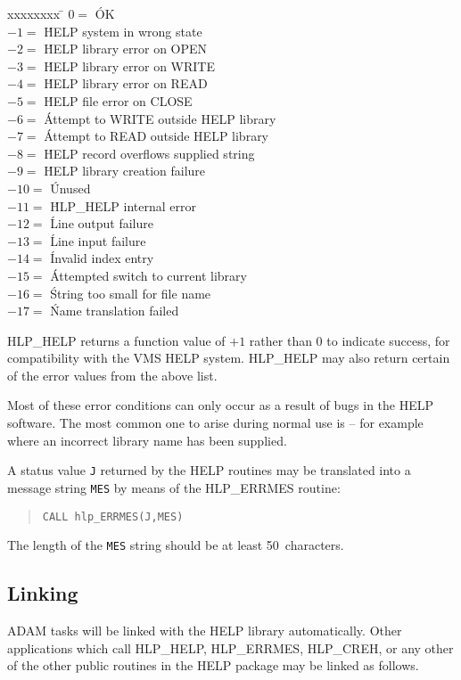 \begin{tabbing}
xxxxxxxx \= \kill
\>   $0=$ \' OK \\
\>  $-1=$ \' HELP system in wrong state \\
\>  $-2=$ \' HELP library error on OPEN \\
\>  $-3=$ \' HELP library error on WRITE \\
\>  $-4=$ \' HELP library error on READ \\
\>  $-5=$ \' HELP file error on CLOSE \\
\>  $-6=$ \' Attempt to WRITE outside HELP library \\
\>  $-7=$ \' Attempt to READ outside HELP library \\
\>  $-8=$ \' HELP record overflows supplied string \\
\>  $-9=$ \' HELP library creation failure \\
\> $-10=$ \' Unused \\
\> $-11=$ \' HLP\_HELP internal error \\
\> $-12=$ \' Line output failure \\
\> $-13=$ \' Line input failure \\
\> $-14=$ \' Invalid index entry \\
\> $-15=$ \' Attempted switch to current library \\
\> $-16=$ \' String too small for file name \\
\> $-17=$ \' Name translation failed
\end{tabbing}

HLP\_HELP returns a function value of $+1$ rather than 0 to indicate
success, for compatibility with the VMS HELP system.  HLP\_HELP may also
return certain of the error values from the above list.

Most of these error conditions can only occur as a result of
bugs in the HELP software.  The most common one to arise during
normal use is  -- for example where
an incorrect library name has been supplied.

A status value \verb|J| returned by the HELP routines may be translated
into a message string \verb|MES| by means of the HLP\_ERRMES routine:
\begin{verse}
\verb|CALL hlp_ERRMES(J,MES)|
\end{verse}
The length of the \verb|MES| string should be at least 50~characters.

\subsection{Linking}
ADAM tasks will be linked with the HELP library automatically.
Other applications which call HLP\_HELP, HLP\_ERRMES, HLP\_CREH,
or any other of the other public
routines in the HELP package may be linked as follows.

